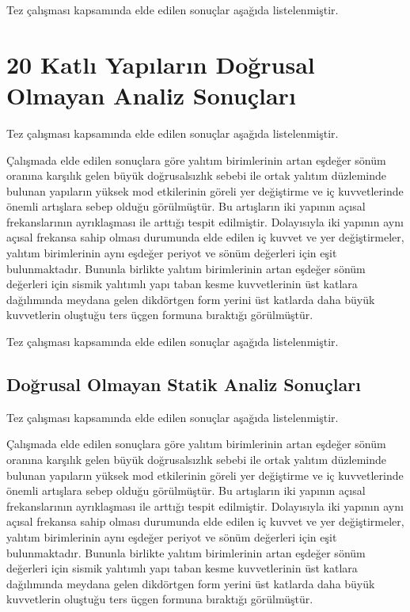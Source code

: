 Tez çalışması kapsamında elde edilen sonuçlar aşağıda listelenmiştir. 

\section{20 Katlı Yapıların Doğrusal Olmayan Analiz Sonuçları}

Tez çalışması kapsamında elde edilen sonuçlar aşağıda listelenmiştir. 

Çalışmada elde edilen sonuçlara göre yalıtım birimlerinin artan eşdeğer
sönüm oranına karşılık gelen büyük doğrusalsızlık sebebi ile ortak
yalıtım düzleminde bulunan yapıların yüksek mod etkilerinin göreli
yer değiştirme ve iç kuvvetlerinde önemli artışlara sebep olduğu görülmüştür.
Bu artışların iki yapının açısal frekanslarının ayrıklaşması ile arttığı
tespit edilmiştir. Dolayısıyla iki yapının aynı açısal frekansa sahip
olması durumunda elde edilen iç kuvvet ve yer değiştirmeler, yalıtım
birimlerinin aynı eşdeğer periyot ve sönüm değerleri için eşit bulunmaktadır.
Bununla birlikte yalıtım birimlerinin artan eşdeğer sönüm değerleri
için sismik yalıtımlı yapı taban kesme kuvvetlerinin üst katlara dağılımında
meydana gelen dikdörtgen form yerini üst katlarda daha büyük kuvvetlerin
oluştuğu ters üçgen formuna bıraktığı görülmüştür.

Tez çalışması kapsamında elde edilen sonuçlar aşağıda listelenmiştir. 

\subsection{Doğrusal Olmayan Statik Analiz Sonuçları}

Tez çalışması kapsamında elde edilen sonuçlar aşağıda listelenmiştir. 

Çalışmada elde edilen sonuçlara göre yalıtım birimlerinin artan eşdeğer
sönüm oranına karşılık gelen büyük doğrusalsızlık sebebi ile ortak
yalıtım düzleminde bulunan yapıların yüksek mod etkilerinin göreli
yer değiştirme ve iç kuvvetlerinde önemli artışlara sebep olduğu görülmüştür.
Bu artışların iki yapının açısal frekanslarının ayrıklaşması ile arttığı
tespit edilmiştir. Dolayısıyla iki yapının aynı açısal frekansa sahip
olması durumunda elde edilen iç kuvvet ve yer değiştirmeler, yalıtım
birimlerinin aynı eşdeğer periyot ve sönüm değerleri için eşit bulunmaktadır.
Bununla birlikte yalıtım birimlerinin artan eşdeğer sönüm değerleri
için sismik yalıtımlı yapı taban kesme kuvvetlerinin üst katlara dağılımında
meydana gelen dikdörtgen form yerini üst katlarda daha büyük kuvvetlerin
oluştuğu ters üçgen formuna bıraktığı görülmüştür.

